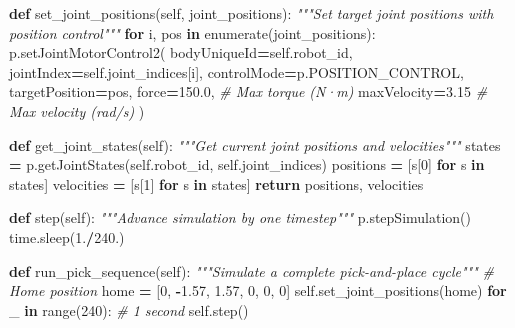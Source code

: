 \documentclass[
]{article}
\newenvironment{Shaded}{\begin{snugshade}}{\end{snugshade}}
\newcommand{\BuiltInTok}[1]{#1}
\newcommand{\CommentTok}[1]{\textcolor[rgb]{0.56,0.35,0.01}{\textit{#1}}}
\newcommand{\ControlFlowTok}[1]{\textcolor[rgb]{0.13,0.29,0.53}{\textbf{#1}}}
\newcommand{\DecValTok}[1]{\textcolor[rgb]{0.00,0.00,0.81}{#1}}
\newcommand{\FloatTok}[1]{\textcolor[rgb]{0.00,0.00,0.81}{#1}}
\newcommand{\KeywordTok}[1]{\textcolor[rgb]{0.13,0.29,0.53}{\textbf{#1}}}
\newcommand{\NormalTok}[1]{#1}
\newcommand{\OperatorTok}[1]{\textcolor[rgb]{0.81,0.36,0.00}{\textbf{#1}}}
\newcommand{\VariableTok}[1]{\textcolor[rgb]{0.00,0.00,0.00}{#1}}
\begin{document}
\begin{Shaded}
\begin{Highlighting}[]
    \KeywordTok{def}\NormalTok{ set\_joint\_positions(}\VariableTok{self}\NormalTok{, joint\_positions):}
        \CommentTok{"""Set target joint positions with position control"""}
        \ControlFlowTok{for}\NormalTok{ i, pos }\KeywordTok{in} \BuiltInTok{enumerate}\NormalTok{(joint\_positions):}
\NormalTok{            p.setJointMotorControl2(}
\NormalTok{                bodyUniqueId}\OperatorTok{=}\VariableTok{self}\NormalTok{.robot\_id,}
\NormalTok{                jointIndex}\OperatorTok{=}\VariableTok{self}\NormalTok{.joint\_indices[i],}
\NormalTok{                controlMode}\OperatorTok{=}\NormalTok{p.POSITION\_CONTROL,}
\NormalTok{                targetPosition}\OperatorTok{=}\NormalTok{pos,}
\NormalTok{                force}\OperatorTok{=}\FloatTok{150.0}\NormalTok{,  }\CommentTok{\# Max torque (N·m)}
\NormalTok{                maxVelocity}\OperatorTok{=}\FloatTok{3.15}  \CommentTok{\# Max velocity (rad/s)}
\NormalTok{            )}

    \KeywordTok{def}\NormalTok{ get\_joint\_states(}\VariableTok{self}\NormalTok{):}
        \CommentTok{"""Get current joint positions and velocities"""}
\NormalTok{        states }\OperatorTok{=}\NormalTok{ p.getJointStates(}\VariableTok{self}\NormalTok{.robot\_id, }\VariableTok{self}\NormalTok{.joint\_indices)}
\NormalTok{        positions }\OperatorTok{=}\NormalTok{ [s[}\DecValTok{0}\NormalTok{] }\ControlFlowTok{for}\NormalTok{ s }\KeywordTok{in}\NormalTok{ states]}
\NormalTok{        velocities }\OperatorTok{=}\NormalTok{ [s[}\DecValTok{1}\NormalTok{] }\ControlFlowTok{for}\NormalTok{ s }\KeywordTok{in}\NormalTok{ states]}
        \ControlFlowTok{return}\NormalTok{ positions, velocities}

    \KeywordTok{def}\NormalTok{ step(}\VariableTok{self}\NormalTok{):}
        \CommentTok{"""Advance simulation by one timestep"""}
\NormalTok{        p.stepSimulation()}
\NormalTok{        time.sleep(}\FloatTok{1.}\OperatorTok{/}\FloatTok{240.}\NormalTok{)}

    \KeywordTok{def}\NormalTok{ run\_pick\_sequence(}\VariableTok{self}\NormalTok{):}
        \CommentTok{"""Simulate a complete pick{-}and{-}place cycle"""}
        \CommentTok{\# Home position}
\NormalTok{        home }\OperatorTok{=}\NormalTok{ [}\DecValTok{0}\NormalTok{, }\OperatorTok{{-}}\FloatTok{1.57}\NormalTok{, }\FloatTok{1.57}\NormalTok{, }\DecValTok{0}\NormalTok{, }\DecValTok{0}\NormalTok{, }\DecValTok{0}\NormalTok{]}
        \VariableTok{self}\NormalTok{.set\_joint\_positions(home)}
        \ControlFlowTok{for}\NormalTok{ \_ }\KeywordTok{in} \BuiltInTok{range}\NormalTok{(}\DecValTok{240}\NormalTok{):  }\CommentTok{\# 1 second}
            \VariableTok{self}\NormalTok{.step()}


\end{Highlighting}
\end{Shaded}
\end{document}
